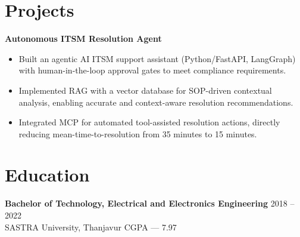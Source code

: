 \documentclass[10pt]{article}
\begin{document}
\section{Projects}

\vspace{5pt}
\noindent\textbf{Autonomous ITSM Resolution Agent}\par
\vspace{5pt}
\begin{itemize}
  \item Built an agentic AI ITSM support assistant (Python/FastAPI, LangGraph) with
        human-in-the-loop approval gates to meet compliance requirements.
  \item Implemented RAG with a vector database for SOP-driven contextual analysis, enabling
        accurate and context-aware resolution recommendations.
  \item Integrated MCP for automated tool-assisted resolution actions, directly reducing
        mean-time-to-resolution from 35 minutes to 15 minutes.
\end{itemize}

\section{Education}

\noindent
\textbf{Bachelor of Technology, Electrical and Electronics Engineering} \hfill 2018 -- 2022 \\
SASTRA University, Thanjavur \hfill CGPA --- 7.97
\end{document}
